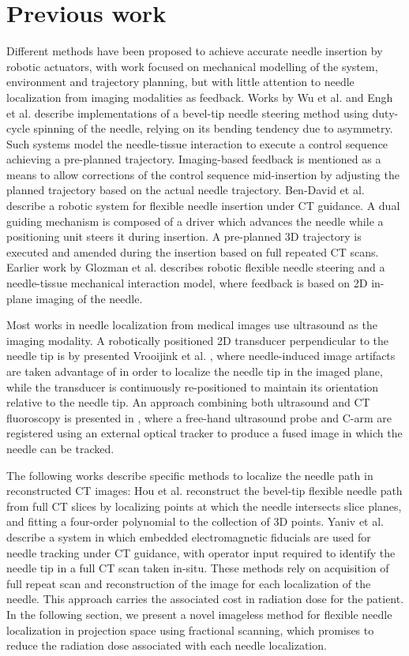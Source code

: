 \documentclass[letterpaper, 11 pt, conference]{ieeeconf} %
\begin{document}
\section{Previous work}
Different methods have been proposed to achieve accurate needle insertion by robotic actuators, with work focused on mechanical modelling of the system, environment and trajectory planning, but with little attention to needle localization from imaging modalities as feedback.
Works by Wu et al. \cite{wu2013automatic} and Engh et al. \cite{engh2010percutaneous} describe implementations of a bevel-tip needle steering method using duty-cycle spinning of the needle, relying on its bending tendency due to asymmetry. Such systems model the needle-tissue interaction to execute a control sequence achieving a pre-planned trajectory. Imaging-based feedback is mentioned as a means to allow corrections of the control sequence mid-insertion by adjusting the planned trajectory based on the actual needle trajectory.
Ben-David et al. \cite{ben2018robotic} describe a robotic system for flexible needle insertion under CT guidance. A dual guiding mechanism is composed of a driver which advances the needle while a positioning unit steers it during insertion. A pre-planned 3D trajectory is executed and amended during the insertion based on full repeated CT scans.
Earlier work by Glozman et al. \cite{glozman2007image} describes robotic flexible needle steering and a needle-tissue mechanical interaction model, where feedback is based on 2D in-plane imaging of the needle.

Most works in needle localization from medical images use ultrasound as the imaging modality. A robotically positioned 2D transducer perpendicular to the needle tip is by presented Vrooijink et al. \cite{vrooijink2013real}, where needle-induced image artifacts are taken advantage of in order to localize the needle tip in the imaged plane, while the transducer is continuously re-positioned to maintain its orientation relative to the needle tip. An approach combining both ultrasound and CT fluoroscopy is presented in \cite{marinetto2017integration}, where a free-hand ultrasound probe and C-arm are registered using an external optical tracker to produce a fused image in which the needle can be tracked.

The following works describe specific methods to localize the needle path in reconstructed CT images:
Hou et al. \cite{huo2015shape} reconstruct the bevel-tip flexible needle path from full CT slices by localizing points at which the needle intersects slice planes, and fitting a four-order polynomial to the collection of 3D points.
Yaniv et al. \cite{yaniv2010needle} describe a system in which embedded electromagnetic fiducials are used for needle tracking under CT guidance, with operator input required to identify the needle tip in a full CT scan taken in-situ. These methods rely on acquisition of full repeat scan and reconstruction of the image for each localization of the needle. This approach carries the associated cost in radiation dose for the patient. In the following section, we present a novel imageless method for flexible needle localization in projection space using fractional scanning, which promises to reduce the radiation dose associated with each needle localization.
\end{document}

